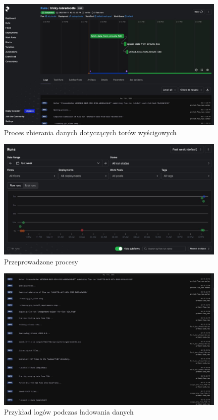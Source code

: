\documentclass[12pt]{article}
\begin{document}
\begin{figure}[H]
    \centering
    \includegraphics[width=\textwidth]{sc2.jpg}
    \caption{Proces zbierania danych dotyczących torów wyścigowych}
\end{figure}

\begin{figure}[H]
    \centering
    \includegraphics[width=\textwidth]{sc4.jpg}
    \caption{Przeprowadzone procesy}
\end{figure}

\begin{figure}[H]
    \centering
    \includegraphics[width=\textwidth]{sc5.jpg}
    \caption{Przykład logów podczas ładowania danych}


\end{figure}
\end{document}
